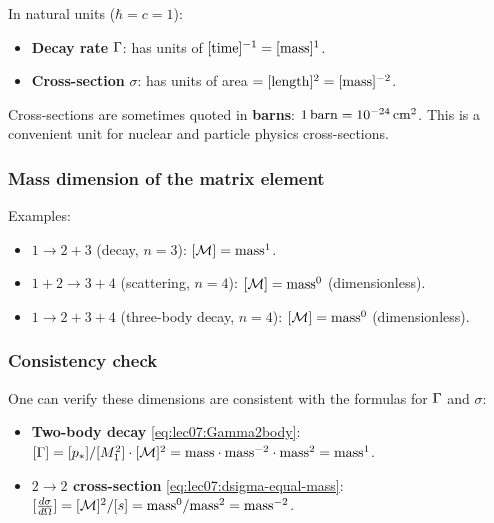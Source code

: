 \documentclass[../main.tex]{subfiles}
\begin{document}
In natural units ($\hbar = c = 1$):
\begin{itemize}
  \item \textbf{Decay rate} $\Gamma$: has units of $[{\rm time}]^{-1} = [{\rm mass}]^1$.
  \item \textbf{Cross-section} $\sigma$: has units of area $= [{\rm length}]^2 = [{\rm mass}]^{-2}$.
\end{itemize}

\begin{remark}
Cross-sections are sometimes quoted in \textbf{barns}: $1\,{\rm barn} = 10^{-24}\,{\rm cm}^2$.  This is a convenient unit for nuclear and particle physics cross-sections.
\end{remark}

\subsubsection*{Mass dimension of the matrix element}


Examples:
\begin{itemize}
  \item $1\to2+3$ (decay, $n=3$): $[\mathcal{M}] = {\rm mass}^1$.
  \item $1+2\to3+4$ (scattering, $n=4$): $[\mathcal{M}] = {\rm mass}^0$ (dimensionless).
  \item $1\to2+3+4$ (three-body decay, $n=4$): $[\mathcal{M}] = {\rm mass}^0$ (dimensionless).
\end{itemize}

\subsubsection*{Consistency check}

One can verify these dimensions are consistent with the formulas for $\Gamma$ and $\sigma$:
\begin{itemize}
  \item \textbf{Two-body decay} \eqref{eq:lec07:Gamma2body}: $[\Gamma] = [p_*]/[M_1^2]\cdot[\mathcal{M}]^2 = {\rm mass}\cdot{\rm mass}^{-2}\cdot{\rm mass}^2 = {\rm mass}^1$.\ \checkmark
  \item \textbf{$2\to2$ cross-section} \eqref{eq:lec07:dsigma-equal-mass}: $[\frac{d\sigma}{d\Omega}] = [\mathcal{M}]^2/[s] = {\rm mass}^0/{\rm mass}^2 = {\rm mass}^{-2}$. \checkmark
\end{itemize}
\end{document}
